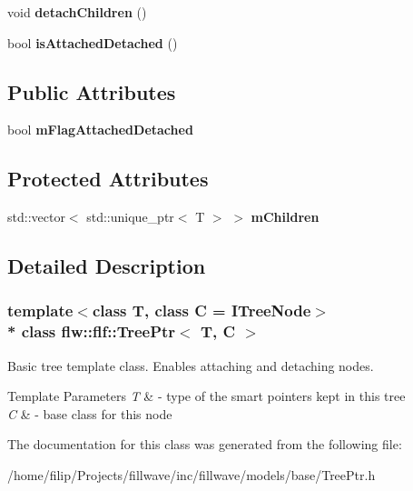 \begin{DoxyCompactItemize}
\item 
void {\bfseries detach\+Children} ()\hypertarget{classflw_1_1flf_1_1TreePtr_a7f65d157133d4596d40bf58ebddb29d3}{}\label{classflw_1_1flf_1_1TreePtr_a7f65d157133d4596d40bf58ebddb29d3}

\item 
bool {\bfseries is\+Attached\+Detached} ()\hypertarget{classflw_1_1flf_1_1TreePtr_adebf899fb4768f1b7b9c473162e48409}{}\label{classflw_1_1flf_1_1TreePtr_adebf899fb4768f1b7b9c473162e48409}

\end{DoxyCompactItemize}
\subsection*{Public Attributes}
\begin{DoxyCompactItemize}
\item 
bool {\bfseries m\+Flag\+Attached\+Detached}\hypertarget{classflw_1_1flf_1_1TreePtr_aa6c1d65eac91ccc16bd573db2cab3f95}{}\label{classflw_1_1flf_1_1TreePtr_aa6c1d65eac91ccc16bd573db2cab3f95}

\end{DoxyCompactItemize}
\subsection*{Protected Attributes}
\begin{DoxyCompactItemize}
\item 
std\+::vector$<$ std\+::unique\+\_\+ptr$<$ T $>$ $>$ {\bfseries m\+Children}\hypertarget{classflw_1_1flf_1_1TreePtr_a4f7344eab3e0ace889a3a80b42a78173}{}\label{classflw_1_1flf_1_1TreePtr_a4f7344eab3e0ace889a3a80b42a78173}

\end{DoxyCompactItemize}


\subsection{Detailed Description}
\subsubsection*{template$<$class T, class C = I\+Tree\+Node$>$\\*
class flw\+::flf\+::\+Tree\+Ptr$<$ T, C $>$}

Basic tree template class. Enables attaching and detaching nodes. 


\begin{DoxyTemplParams}{Template Parameters}
{\em T} & -\/ type of the smart pointers kept in this tree\\
\hline
{\em C} & -\/ base class for this node \\
\hline
\end{DoxyTemplParams}


The documentation for this class was generated from the following file\+:\begin{DoxyCompactItemize}
\item 
/home/filip/\+Projects/fillwave/inc/fillwave/models/base/Tree\+Ptr.\+h\end{DoxyCompactItemize}
